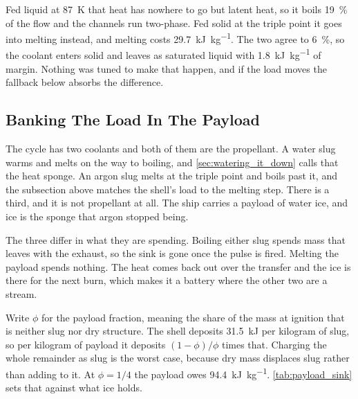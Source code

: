 \documentclass{article}
\begin{document}
Fed liquid at \SI{87}{\kelvin} that heat has nowhere to go but latent heat, so it boils \SI{19}{\percent} of the flow and the channels run two-phase. Fed solid at the triple point it goes into melting instead, and melting costs \SI{29.7}{\kilo\joule\per\kilogram}. The two agree to \SI{6}{\percent}, so the coolant enters solid and leaves as saturated liquid with \SI{1.8}{\kilo\joule\per\kilogram} of margin. Nothing was tuned to make that happen, and if the load moves the fallback below absorbs the difference.

\subsection*{Banking The Load In The Payload}
The cycle has two coolants and both of them are the propellant. A water slug warms and melts on the way to boiling, and \autoref{sec:watering_it_down} calls that the heat sponge. An argon slug melts at the triple point and boils past it, and the subsection above matches the shell's load to the melting step. There is a third, and it is not propellant at all. The ship carries a payload of water ice, and ice is the sponge that argon stopped being.

The three differ in what they are spending. Boiling either slug spends mass that leaves with the exhaust, so the sink is gone once the pulse is fired. Melting the payload spends nothing. The heat comes back out over the transfer and the ice is there for the next burn, which makes it a battery where the other two are a stream.

Write $\phi$ for the payload fraction, meaning the share of the mass at ignition that is neither slug nor dry structure. The shell deposits \SI{31.5}{\kilo\joule} per kilogram of slug, so per kilogram of payload it deposits $(1-\phi)/\phi$ times that. Charging the whole remainder as slug is the worst case, because dry mass displaces slug rather than adding to it. At $\phi = 1/4$ the payload owes \SI{94.4}{\kilo\joule\per\kilogram}. \autoref{tab:payload_sink} sets that against what ice holds.
\end{document}
